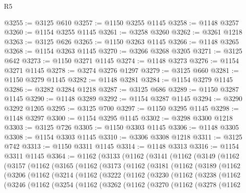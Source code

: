 \begin{lexlean}{R5}
\begin{coremodule}
@3255 := @3125 @610
@3257 := @1150 @3255 @1145
@3258 := @1148 @3257
@3260 := @1154 @3255 @1145
@3261 := @3258 @3260
@3262 := @3261 @1218
@3263 := @3125 @626
@3265 := @1150 @3263 @1145
@3266 := @1148 @3265
@3268 := @1154 @3263 @1145
@3270 := @3266 @3268 @3205
@3271 := @3125 @642
@3273 := @1150 @3271 @1145
@3274 := @1148 @3273
@3276 := @1154 @3271 @1145
@3278 := @3274 @3276 @1297
@3279 := @3125 @660
@3281 := @1150 @3279 @1145
@3282 := @1148 @3281
@3284 := @1154 @3279 @1145
@3286 := @3282 @3284 @1218
@3287 := @3125 @686
@3289 := @1150 @3287 @1145
@3290 := @1148 @3289
@3292 := @1154 @3287 @1145
@3294 := @3290 @3292 @1205
@3295 := @3125 @700
@3297 := @1150 @3295 @1145
@3298 := @1148 @3297
@3300 := @1154 @3295 @1145
@3302 := @3298 @3300 @1218
@3303 := @3125 @726
@3305 := @1150 @3303 @1145
@3306 := @1148 @3305
@3308 := @1154 @3303 @1145
@3310 := @3306 @3308 @1218
@3311 := @3125 @742
@3313 := @1150 @3311 @1145
@3314 := @1148 @3313
@3316 := @1154 @3311 @1145
@3364 := @1162
    (@3133
      (@1162
        (@3141
          (@1162
            (@3149
              (@1162
                (@3157
                  (@1162
                    (@3165
                      (@1162
                        (@3173
                          (@1162
                            (@3181
                              (@1162
                                (@3189
                                  (@1162
                                    (@3206
                                      (@1162
                                        (@3214
                                          (@1162
                                            (@3222
                                              (@1162
                                                (@3230
                                                  (@1162
                                                    (@3238
                                                      (@1162
                                                        (@3246
                                                          (@1162
                                                            (@3254
                                                              (@1162
                                                                (@3262
                                                                  (@1162
                                                                    (@3270
                                                                      (@1162
                                                                        (@3278
                                                                          (@1162

\end{coremodule}
\end{lexlean}
